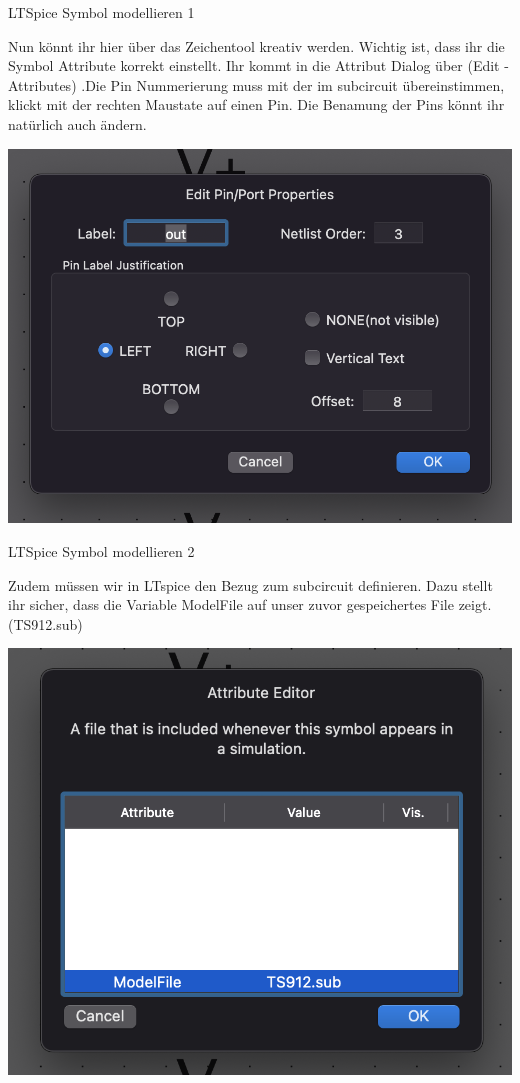 \begin{frame}[t]{LTSpice Symbol modellieren 1} 

    Nun könnt ihr hier über das Zeichentool kreativ werden.
    Wichtig ist, dass ihr die Symbol Attribute korrekt einstellt. Ihr kommt in
    die Attribut Dialog über (Edit -\> Attributes) .Die Pin Nummerierung muss 
    mit der im subcircuit übereinstimmen, klickt mit der rechten Maustate auf einen Pin.
    Die Benamung der Pins könnt ihr natürlich auch ändern.

    \begin{spacing}{0.9} \begin{tiny}
        \begin{minipage}{\textwidth}
          \includegraphics[width=0.6\linewidth]{pictures/pinNummerierung.png}
        \end{minipage}
    \end{tiny} \end{spacing}

\end{frame}


\begin{frame}[t]{LTSpice Symbol modellieren 2}

    Zudem müssen wir in LTspice den Bezug zum subcircuit definieren. Dazu stellt ihr sicher, dass die
    Variable ModelFile auf unser zuvor gespeichertes File zeigt. (TS912.sub)

    \begin{spacing}{0.9} \begin{tiny}
        \begin{minipage}{\textwidth}
          \includegraphics[width=0.6\linewidth]{pictures/spiceModel.png}
        \end{minipage}
    \end{tiny} \end{spacing}

\end{frame}

